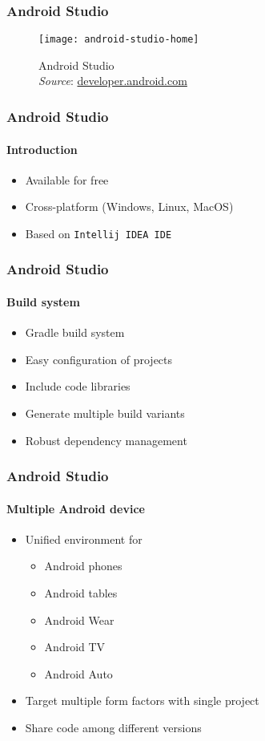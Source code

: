 %
%


\begin{frame}[plain]
  \frametitle{Android Studio}

  \begin{figure}
    \centering
    \texttt{[image: android-studio-home]}
    \caption{Android Studio \\
      \emph{Source}: \url{developer.android.com}}
    \label{fig:android-studio-home}
  \end{figure}
  
\end{frame}

\begin{frame}
  \frametitle{Android Studio}
  \framesubtitle{Introduction}

  \begin{itemize}
  \item<1-> Available for free
  \item<2-> Cross-platform (Windows, Linux, MacOS)
  \item<3-> Based on \texttt{Intellij IDEA IDE}
  \end{itemize}

\end{frame}


\begin{frame}
  \frametitle{Android Studio}
  \framesubtitle{Build system}

  \begin{itemize}
  \item<1-> Gradle build system
  \item<2-> Easy configuration of projects
  \item<3-> Include code libraries
  \item<4-> Generate multiple build variants
  \item<5-> Robust dependency management
  \end{itemize}

\end{frame}


\begin{frame}
  \frametitle{Android Studio}
  \framesubtitle{Multiple Android device}

  \begin{itemize}
  \item<1-> Unified environment for
    \begin{itemize}
    \item<2-> Android phones
    \item<3-> Android tables
    \item<4-> Android Wear
    \item<5-> Android TV
    \item<6-> Android Auto
    \end{itemize}
  \item<7-> Target multiple form factors with single project
  \item<8-> Share code among different versions
  \end{itemize}

\end{frame}

